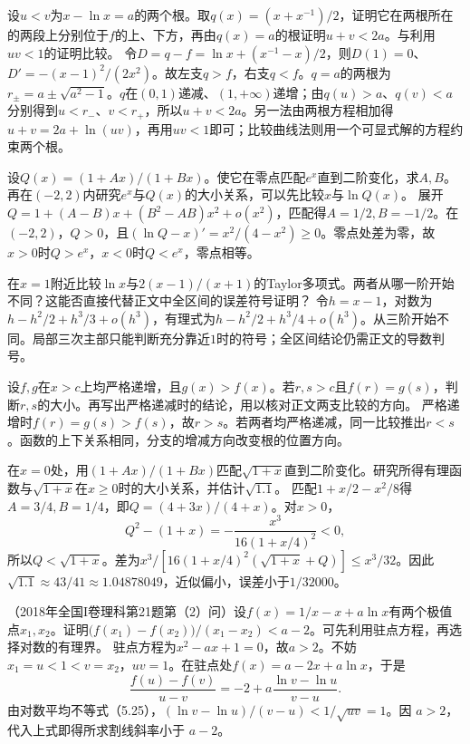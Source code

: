 设\(u<v\)为\(x-\ln x=a\)的两个根。取\(q(x)=(x+x^{-1})/2\)，证明它在两根所在的两段上分别位于\(f\)的上、下方，再由\(q(x)=a\)的根证明\(u+v<2a\)。与利用\(uv<1\)的证明比较。
\solutionanswer
令\(D=q-f=\ln x+(x^{-1}-x)/2\)，则\(D(1)=0\)、\(D'=-(x-1)^2/(2x^2)\)。故左支\(q>f\)，右支\(q<f\)。\(q=a\)的两根为\(r_\pm=a\pm\sqrt{a^2-1}\)。\(q\)在\((0,1)\)递减、\((1,+\infty)\)递增；由\(q(u)>a\)、\(q(v)<a\)分别得到\(u<r_-\)、\(v<r_+\)，所以\(u+v<2a\)。另一法由两根方程相加得\(u+v=2a+\ln(uv)\)，再用\(uv<1\)即可；比较曲线法则用一个可显式解的方程约束两个根。


设\(Q(x)=(1+Ax)/(1+Bx)\)。使它在零点匹配\(e^x\)直到二阶变化，求\(A,B\)。再在\((-2,2)\)内研究\(e^x\)与\(Q(x)\)的大小关系，可以先比较\(x\)与\(\ln Q(x)\)。
\solutionanswer
展开\(Q=1+(A-B)x+(B^2-AB)x^2+o(x^2)\)，匹配得\(A=1/2,B=-1/2\)。在\((-2,2)\)，\(Q>0\)，且\((\ln Q-x)'=x^2/(4-x^2)\ge0\)。零点处差为零，故\(x>0\)时\(Q>e^x\)，\(x<0\)时\(Q<e^x\)，零点相等。


在\(x=1\)附近比较\(\ln x\)与\(2(x-1)/(x+1)\)的Taylor多项式。两者从哪一阶开始不同？这能否直接代替正文中全区间的误差符号证明？
\solutionanswer
令\(h=x-1\)，对数为\(h-h^2/2+h^3/3+o(h^3)\)，有理式为\(h-h^2/2+h^3/4+o(h^3)\)。从三阶开始不同。局部三次主部只能判断充分靠近\(1\)时的符号；全区间结论仍需正文的导数判号。


设\(f,g\)在\(x>c\)上均严格递增，且\(g(x)>f(x)\)。若\(r,s>c\)且\(f(r)=g(s)\)，判断\(r,s\)的大小。再写出严格递减时的结论，用以核对正文两支比较的方向。
\solutionanswer
严格递增时\(f(r)=g(s)>f(s)\)，故\(r>s\)。若两者均严格递减，同一比较推出\(r<s\)。函数的上下关系相同，分支的增减方向改变根的位置方向。


在\(x=0\)处，用\((1+Ax)/(1+Bx)\)匹配\(\sqrt{1+x}\)直到二阶变化。研究所得有理函数与\(\sqrt{1+x}\)在\(x\ge0\)时的大小关系，并估计\(\sqrt{1.1}\)。
\solutionanswer
匹配\(1+x/2-x^2/8\)得\(A=3/4,B=1/4\)，即\(Q=(4+3x)/(4+x)\)。对\(x>0\)，
\[
 Q^2-(1+x)=-\frac{x^3}{16(1+x/4)^2}<0,
\]
所以\(Q<\sqrt{1+x}\)。差为\(x^3/[16(1+x/4)^2(\sqrt{1+x}+Q)]\le x^3/32\)。因此\(\sqrt{1.1}\approx43/41\approx1.04878049\)，近似偏小，误差小于\(1/32000\)。


（2018年全国I卷理科第21题第（2）问）设\(f(x)=1/x-x+a\ln x\)有两个极值点\(x_1,x_2\)。证明\(\bigl(f(x_1)-f(x_2)\bigr)/(x_1-x_2)<a-2\)。可先利用驻点方程，再选择对数的有理界。
\solutionanswer
驻点方程为\(x^2-ax+1=0\)，故\(a>2\)。不妨\(x_1=u<1<v=x_2\)，\(uv=1\)。在驻点处\(f(x)=a-2x+a\ln x\)，于是
\[
 \frac{f(u)-f(v)}{u-v}=-2+a\frac{\ln v-\ln u}{v-u}.
\]
由对数平均不等式（5.25），\((\ln v-\ln u)/(v-u)<1/\sqrt{uv}=1\)。因 \(a>2\)，代入上式即得所求割线斜率小于 \(a-2\)。


